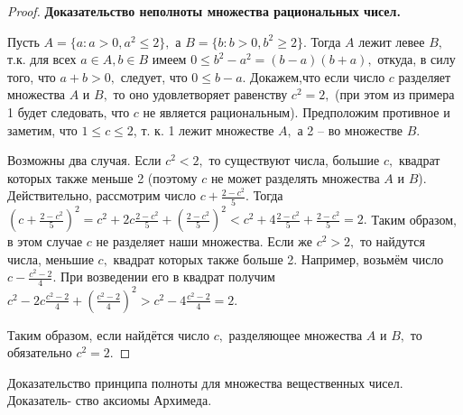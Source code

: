 \begin{proof} \textbf{Доказательство неполноты множества рациональных чисел.}

    Пусть
    $A=\{a: a>0, a^2\leq2\},$ а
    $B=\{b: b>0, b^2\geq2\}.$
    Тогда $A$ лежит левее $B,$ т.к.
    для всех $a\in A, b\in B$ имеем
    $0\leq b^2-a^2=(b-a)(b+a),$ откуда,
    в силу того, что $a+b>0,$ следует,
    что $0\leq b-a.$ Докажем,что
    если число $c$ разделяет множества
    $A$ и $B,$ то оно удовлетворяет
    равенству $c^2=2,$  (при этом из примера
    1 будет следовать, что $c$ не является
    рациональным). Предположим противное и
    заметим, что $1\leq c\leq 2$, т. к.
    1 лежит множестве $A,$ а 2 --
    во множестве $B.$

    Возможны два случая. Если $c^2<2,$
    то существуют числа, большие $c,$
    квадрат которых также меньше 2
    (поэтому $c$ не может разделять
    множества $A$ и $B$). Действительно,
    рассмотрим число $c+\frac{2-c^2}{5}.$
    Тогда $\left(c+\frac{2-c^2}{5}\right)^2=
        c^2+2c\frac{2-c^2}{5}+
        \left(\frac{2-c^2}{5}\right)^2<
        c^2+4\frac{2-c^2}{5}+\frac{2-c^2}{5}=2.$
    Таким образом, в этом случае $c$ не
    разделяет наши множества.
    Если же $c^2>2,$ то найдутся числа,
    меньшие $c,$ квадрат которых также
    больше 2. Например, возьмём число
    $c-\frac{c^2-2}{4}.$ При возведении
    его в квадрат получим
    $c^2-2c\frac{c^2-2}{4}+\left(
        \frac{c^2-2}{4}\right)^2>
        c^2-4\frac{c^2-2}{4}=2.$

    Таким образом, если найдётся
    число $c,$ разделяющее множества
    $A$ и $B,$ то обязательно $c^2=2.$
\end{proof}

\newpage
\begin{problem}
Доказательство принципа полноты для множества вещественных чисел. Доказатель-
ство аксиомы Архимеда.
\end{problem}


